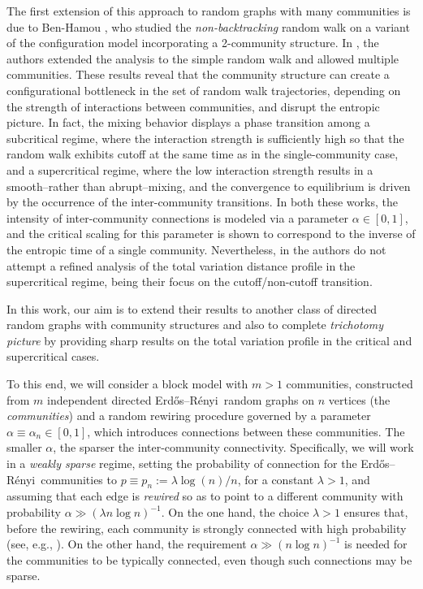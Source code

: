 \documentclass[11pt,oneside]{amsart}
\numberwithin{equation}{section}  %
\theoremstyle{plain}
\newcommand{\er}{Erdős–Rényi~}
\begin{document}
The first extension of this approach to random graphs with many communities is due to Ben-Hamou \cite{Ben-Hamou}, who studied the \emph{non-backtracking} random walk on a variant of the configuration model incorporating a 2-community structure. 
In \cite{HSS}, the authors extended the analysis to the simple random walk and allowed multiple communities.
These results reveal
that the community structure can create a configurational bottleneck
in the set of random walk trajectories, depending on the strength
of interactions between communities, and disrupt the entropic picture. 
In fact, the mixing behavior displays a phase transition
among a subcritical regime, where the interaction strength is sufficiently high so that 
the random walk exhibits cutoff at the same time as in the single-community case,  
and a supercritical regime, where the low interaction strength results in a smooth--rather than abrupt--mixing, and the convergence to equilibrium is driven by the occurrence of the inter-community transitions. In both these works, the intensity of inter-community connections is modeled via a parameter $\alpha\in[0,1]$, and the critical scaling for this parameter is shown to correspond to the inverse of the entropic time of a single community. Nevertheless, in \cite{Ben-Hamou,HSS} the authors do not attempt a refined analysis of the total variation distance profile in the supercritical regime, being their focus on the cutoff/non-cutoff transition.

In this work, our aim is to extend their results to another class of directed random graphs with community structures and also to complete \emph{trichotomy picture} by providing sharp results on the total variation profile in the critical and supercritical cases.

To this end, we will consider a block model with $m > 1$ communities, 
constructed from $m$ independent directed \er random graphs on $n$ vertices (the \emph{communities}) and a random rewiring procedure governed by a parameter
$\alpha \equiv \alpha_n \in [0,1]$, which introduces connections between these communities. The smaller $\alpha$, the sparser the inter-community connectivity.
Specifically, we will work in a \emph{weakly sparse} regime, setting the probability of connection for the \er communities to
$p \equiv p_n := \lambda \log(n) / n$, for a constant $\lambda > 1$, and assuming
that each edge is \emph{rewired} so as to point to a different community with probability $\alpha\gg (\lambda n\log n)^{-1}$. 
On the one hand, 
the choice $\lambda>1$ ensures that, before the rewiring, each community is strongly connected with high probability (see, e.g., \cite{CF}). On the other hand, the requirement $\alpha\gg (n\log n)^{-1}$ is needed for the communities to be typically connected, even though such connections may be sparse.
\end{document}
